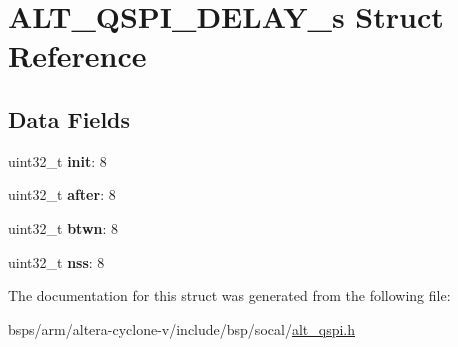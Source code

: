\hypertarget{structALT__QSPI__DELAY__s}{}\section{A\+L\+T\+\_\+\+Q\+S\+P\+I\+\_\+\+D\+E\+L\+A\+Y\+\_\+s Struct Reference}
\label{structALT__QSPI__DELAY__s}
\subsection*{Data Fields}
\begin{DoxyCompactItemize}
\item 
\mbox{\label{structALT__QSPI__DELAY__s_a2461f025da51aa5b10e739433219fd7c}} 
uint32\+\_\+t {\bfseries init}\+: 8
\item 
\mbox{\label{structALT__QSPI__DELAY__s_a8ad16d4709eae476b0c95cd2aad20d1c}} 
uint32\+\_\+t {\bfseries after}\+: 8
\item 
\mbox{\label{structALT__QSPI__DELAY__s_a71adb6d53ae7ea363e8c13992a9e37e1}} 
uint32\+\_\+t {\bfseries btwn}\+: 8
\item 
\mbox{\label{structALT__QSPI__DELAY__s_a2ae65468351c4ec63a8a5ec441d5090e}} 
uint32\+\_\+t {\bfseries nss}\+: 8
\end{DoxyCompactItemize}


The documentation for this struct was generated from the following file\+:\begin{DoxyCompactItemize}
\item 
bsps/arm/altera-\/cyclone-\/v/include/bsp/socal/\mbox{\hyperlink{include_2bsp_2socal_2alt__qspi_8h}{alt\+\_\+qspi.\+h}}\end{DoxyCompactItemize}
